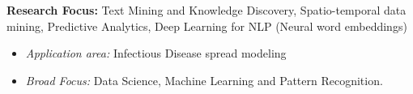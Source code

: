 \par{\textbf{Research Focus: } Text Mining and Knowledge Discovery, Spatio-temporal data mining, Predictive Analytics, Deep Learning for NLP (Neural word embeddings)\vspace{0.5em}
\begin{itemize}
  \item \textit{Application area:} Infectious Disease spread modeling\\
  \item \textit{Broad Focus:} Data Science, Machine Learning and Pattern Recognition.\\
\end{itemize}
}
\vspace{1em}
